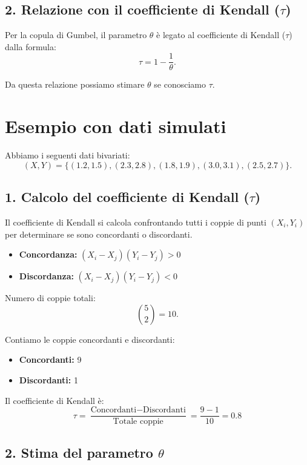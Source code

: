 \documentclass[a4paper,12pt]{article}
\begin{document}
\begin{itemize}
	\subsection*{2. Relazione con il coefficiente di Kendall (\(\tau\))}
	Per la copula di Gumbel, il parametro \(\theta\) è legato al coefficiente di Kendall (\(\tau\)) dalla formula:
	\[
	\tau = 1 - \frac{1}{\theta}.
	\]
	
	Da questa relazione possiamo stimare \(\theta\) se conosciamo \(\tau\).
	
	\section*{Esempio con dati simulati}
	
	Abbiamo i seguenti dati bivariati:
	\[
	(X, Y) = \{(1.2, 1.5), (2.3, 2.8), (1.8, 1.9), (3.0, 3.1), (2.5, 2.7)\}.
	\]
	
	\subsection*{1. Calcolo del coefficiente di Kendall (\(\tau\))}
	
	Il coefficiente di Kendall si calcola confrontando tutti i coppie di punti \((X_i, Y_i)\) per determinare se sono concordanti o discordanti.
	
	\begin{itemize}
		\item \textbf{Concordanza:} \((X_i - X_j)(Y_i - Y_j) > 0\)
		\item \textbf{Discordanza:} \((X_i - X_j)(Y_i - Y_j) < 0\)
	\end{itemize}
	
	Numero di coppie totali:
	\[
	\binom{5}{2} = 10.
	\]
	
	Contiamo le coppie concordanti e discordanti:
	\begin{itemize}
		\item \textbf{Concordanti:} 9
		\item \textbf{Discordanti:} 1
	\end{itemize}
	
	Il coefficiente di Kendall è:
	\[
	\tau = \frac{\text{Concordanti} - \text{Discordanti}}{\text{Totale coppie}} = \frac{9 - 1}{10} = 0.8
	\]
	
	\subsection*{2. Stima del parametro \(\theta\)}
	

\end{itemize}
\end{document}
